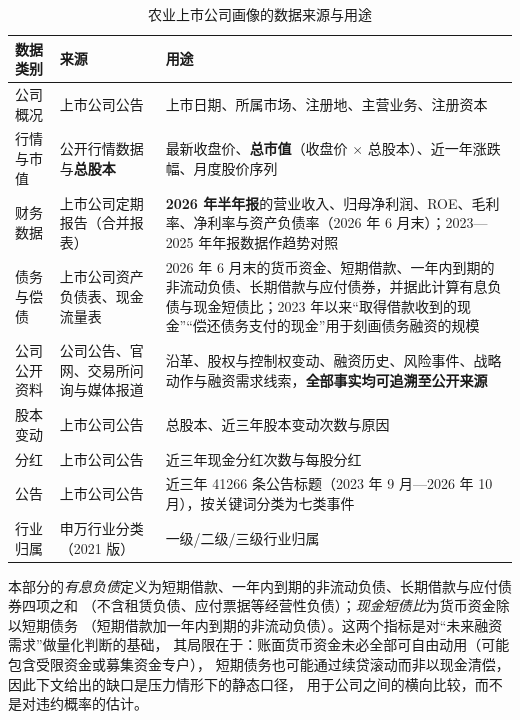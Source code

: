 \renewcommand{\arraystretch}{1.15}
\begin{table}[htbp]
\centering
\footnotesize
\caption{农业上市公司画像的数据来源与用途}
\label{tab:comp-source}
\begin{tabular}{@{}p{2.8cm}p{4.0cm}p{7.8cm}@{}}
\toprule
数据类别 & 来源 & 用途 \\
\midrule
公司概况 & 上市公司公告 & 上市日期、所属市场、注册地、主营业务、注册资本 \\
行情与市值 & 公开行情数据与\textbf{总股本} & 最新收盘价、\textbf{总市值}（收盘价 $\times$ 总股本）、近一年涨跌幅、月度股价序列 \\
财务数据 & 上市公司定期报告（合并报表） & \textbf{2026 年半年报}的营业收入、归母净利润、ROE、毛利率、净利率与资产负债率（2026 年 6 月末）；2023---2025 年年报数据作趋势对照 \\
债务与偿债 & 上市公司资产负债表、现金流量表 & 2026 年 6 月末的货币资金、短期借款、一年内到期的非流动负债、长期借款与应付债券，并据此计算有息负债与现金短债比；2023 年以来“取得借款收到的现金”“偿还债务支付的现金”用于刻画债务融资的规模 \\
公司公开资料 & 公司公告、官网、交易所问询与媒体报道 & 沿革、股权与控制权变动、融资历史、风险事件、战略动作与融资需求线索，\textbf{全部事实均可追溯至公开来源} \\
股本变动 & 上市公司公告 & 总股本、近三年股本变动次数与原因 \\
分红 & 上市公司公告 & 近三年现金分红次数与每股分红 \\
公告 & 上市公司公告 & 近三年 \num{41266} 条公告标题（2023 年 9 月---2026 年 10 月），按关键词分类为七类事件 \\
行业归属 & 申万行业分类（2021 版） & 一级/二级/三级行业归属 \\
\bottomrule
\end{tabular}
\end{table}

本部分的\emph{有息负债}定义为短期借款、一年内到期的非流动负债、长期借款与应付债券四项之和
（不含租赁负债、应付票据等经营性负债）；\emph{现金短债比}为货币资金除以短期债务
（短期借款加一年内到期的非流动负债）。这两个指标是对“未来融资需求”做量化判断的基础，
其局限在于：账面货币资金未必全部可自由动用（可能包含受限资金或募集资金专户），
短期债务也可能通过续贷滚动而非以现金清偿，因此下文给出的缺口是压力情形下的静态口径，
用于公司之间的横向比较，而不是对违约概率的估计。

